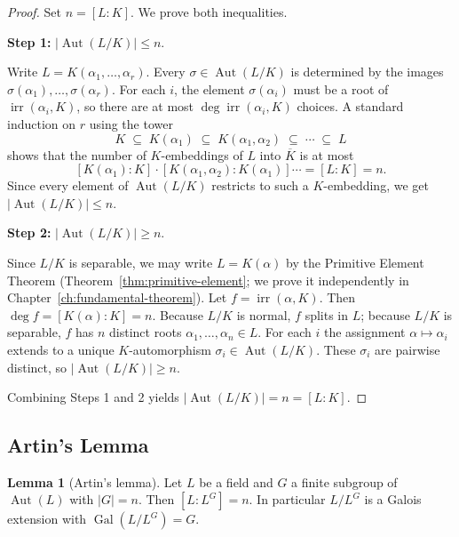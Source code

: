 \documentclass[12pt,a4paper,openany]{book}
\theoremstyle{definition}
\newtheorem{lemma}{Lemma}[chapter]
\theoremstyle{remark}
\DeclareMathOperator{\Gal}{Gal}
\DeclareMathOperator{\Aut}{Aut}
\renewcommand{\deg}{\operatorname{deg}}
\DeclareMathOperator{\irr}{irr}
\begin{document}
\begin{proof}
Set $n=[L:K]$.  We prove both inequalities.

\medskip\noindent
\textbf{Step 1:} $|\!\Aut(L/K)|\leq n$.

Write $L=K(\alpha_{1},\dots,\alpha_{r})$.  Every $\sigma\in\Aut(L/K)$ is
determined by the images $\sigma(\alpha_{1}),\dots,\sigma(\alpha_{r})$.
For each $i$, the element $\sigma(\alpha_{i})$ must be a root of
$\irr(\alpha_{i},K)$, so there are at most $\deg\irr(\alpha_{i},K)$
choices.  A standard induction on $r$ using the tower
\[
  K\;\subseteq\; K(\alpha_{1})\;\subseteq\;
  K(\alpha_{1},\alpha_{2})\;\subseteq\;\cdots\;\subseteq\; L
\]
shows that the number of $K$-embeddings of $L$ into $\overline{K}$ is at most
\[
  [K(\alpha_{1}):K]\cdot[K(\alpha_{1},\alpha_{2}):K(\alpha_{1})]
  \cdots = [L:K] = n.
\]
Since every element of $\Aut(L/K)$ restricts to such a $K$-embedding, we get
$|\!\Aut(L/K)|\leq n$.

\medskip\noindent
\textbf{Step 2:} $|\!\Aut(L/K)|\geq n$.

Since $L/K$ is separable, we may write $L=K(\alpha)$ by the Primitive
Element Theorem (Theorem~\ref{thm:primitive-element}; we prove it
independently in Chapter~\ref{ch:fundamental-theorem}).  Let
$f=\irr(\alpha,K)$.  Then $\deg f=[K(\alpha):K]=n$.  Because $L/K$ is
normal, $f$ splits in $L$; because $L/K$ is separable, $f$ has $n$ distinct
roots $\alpha_{1},\dots,\alpha_{n}\in L$.  For each $i$ the assignment
$\alpha\mapsto\alpha_{i}$ extends to a unique $K$-automorphism
$\sigma_{i}\in\Aut(L/K)$.  These $\sigma_{i}$ are pairwise distinct,
so $|\!\Aut(L/K)|\geq n$.

\medskip
Combining Steps 1 and 2 yields $|\!\Aut(L/K)|=n=[L:K]$.
\end{proof}

\subsection{Artin's Lemma}
\label{subsec:artin-lemma}

\begin{lemma}[Artin's lemma]\label{lem:artin}
Let $L$ be a field and $G$ a finite subgroup of $\Aut(L)$ with $|G|=n$.
Then $[L:L^{G}]=n$.  In particular $L/L^{G}$ is a Galois extension with
$\Gal(L/L^{G})=G$.
\end{lemma}
\end{document}
